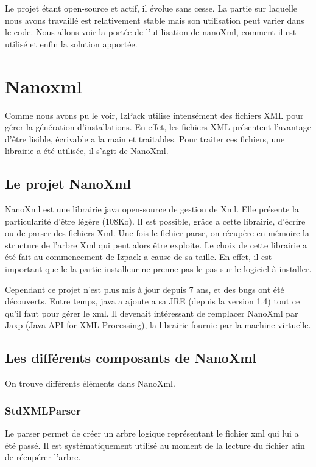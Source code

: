Le projet étant open-source et actif, il évolue sans cesse. La partie sur laquelle nous avons travaillé est relativement stable mais son utilisation peut varier dans le code. Nous allons voir la portée de l'utilisation de nanoXml, comment il est utilisé et enfin la solution apportée.

\section{Nanoxml}
Comme nous avons pu le voir, IzPack utilise intensément des fichiers XML pour gérer la génération d'installations.
En effet, les fichiers XML présentent l'avantage d'être lisible, écrivable a la main et traitables.
Pour traiter ces fichiers, une librairie a été utilisée, il s'agit de NanoXml.
\subsection{Le projet NanoXml}
NanoXml est une librairie java open-source de gestion de Xml.
Elle présente la particularité d'être légère (108Ko). Il est possible, grâce a cette librairie, d'écrire ou de parser des fichiers Xml.
Une fois le fichier parse, on récupère en mémoire la structure de l'arbre Xml qui peut alors être exploite.
Le choix de cette librairie a été fait au commencement de Izpack a cause de sa taille.
En effet, il est important que le la partie installeur ne prenne pas le pas sur le logiciel à installer.

Cependant ce projet n'est plus mis à jour depuis 7 ans, et des bugs ont été découverts.
Entre temps, java a ajoute a sa JRE (depuis la version 1.4) tout ce qu'il faut pour gérer le xml.
Il devenait intéressant de remplacer NanoXml par Jaxp (Java API for XML Processing), la librairie fournie par la machine virtuelle.
\subsection{Les différents composants de NanoXml}
On trouve différents éléments dans NanoXml.
\subsubsection{StdXMLParser}
Le parser permet de créer un arbre logique représentant le fichier xml qui lui a été passé.
Il est systématiquement utilisé au moment de la lecture du fichier afin de récupérer l'arbre.
